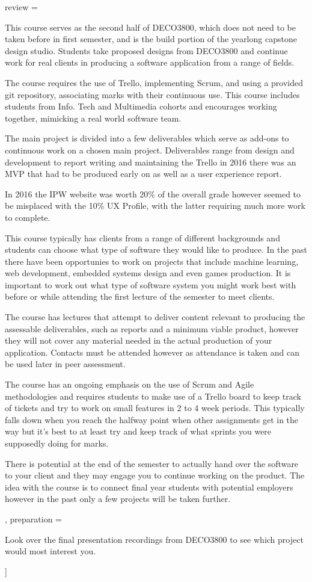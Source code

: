 review = {
    This course serves as the second half of DECO3800, which does not need to be taken before in first semester, and is the build portion of the yearlong capstone design studio. Students take proposed designs from DECO3800 and continue work for real clients in producing a software application from a range of fields.

    The course requires the use of Trello, implementing Scrum, and using a provided git repository, associating marks with their continuous use. This course includes students from Info. Tech and Multimedia cohorts and encourages working together, mimicking a real world software team.

    The main project is divided into a few deliverables which serve as add-ons to continuous work on a chosen main project. Deliverables range from design and development to report writing and maintaining the Trello in 2016 there was an MVP that had to be produced early on as well as a user experience report.

    In 2016 the IPW website was worth 20\% of the overall grade however seemed to be misplaced with the 10\% UX Profile, with the latter requiring much more work to complete.

    This course typically has clients from a range of different backgrounds and students can choose what type of software they would like to produce. In the past there have been opportunies to work on projects that include machine learning, web development, embedded systems design and even games production. It is important to work out what type of software system you might work best with before or while attending the first lecture of the semester to meet clients.

    The course has lectures that attempt to deliver content relevant to producing the assessable deliverables, such as reports and a minimum viable product, however they will not cover any material needed in the actual production of your application. Contacts must be attended however as attendance is taken and can be used later in peer assessment.

    The course has an ongoing emphasis on the use of Scrum and Agile methodologies and requires students to make use of a Trello board to keep track of tickets and try to work on small features in 2 to 4 week periods. This typically falls down when you reach the halfway point when other assignments get in the way but it's best to at least try and keep track of what sprints you were supposedly doing for marks.

    There is potential at the end of the semester to actually hand over the software to your client and they may engage you to continue working on the product. The idea with the course is to connect final year students with potential employers however in the past only a few projects will be taken further.
},
preparation = {
    \item Look over the final presentation recordings from DECO3800 to see which project would most interest you.
}]{}
